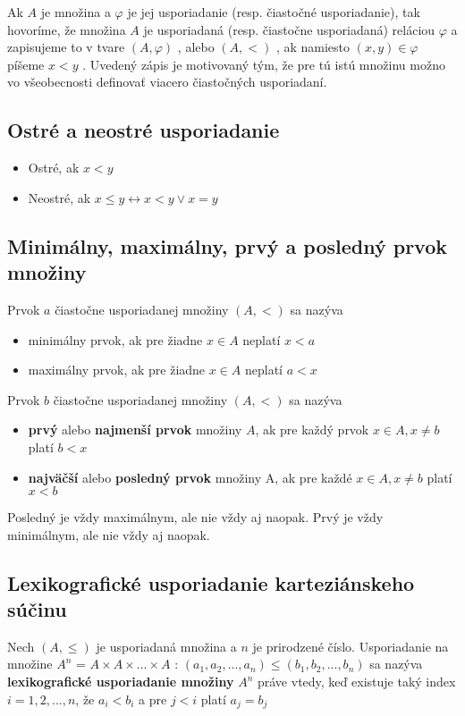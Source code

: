 		Ak $A$ je množina a $\varphi$ je jej usporiadanie (resp. čiastočné usporiadanie), tak hovoríme, že množina $A$ je usporiadaná (resp. čiastočne usporiadaná) reláciou $\varphi$ a zapisujeme to v tvare $( A, \varphi )$ , alebo $( A, < )$ , ak namiesto $( x, y) \in \varphi $ píšeme $x < y$ . Uvedený zápis je motivovaný tým, že pre tú istú množinu možno vo všeobecnosti definovať viacero čiastočných usporiadaní.

	\subsection{Ostré a neostré usporiadanie}
		\begin{itemize}
			\item Ostré, ak $x<y$
			\item Neostré, ak $x \leq y \leftrightarrow x < y \vee x = y$
		\end{itemize}
	\subsection{Minimálny, maximálny, prvý a posledný prvok množiny}
		Prvok $a$ čiastočne usporiadanej množiny $( A, < )$ sa nazýva
		\begin{itemize}
			\item minimálny prvok, ak pre žiadne $x \in A$ neplatí $x < a$
			\item maximálny prvok, ak pre žiadne $x \in A$ neplatí $a < x$
		\end{itemize}
		Prvok $b$ čiastočne usporiadanej množiny $( A, <)$ sa nazýva
		\begin{itemize} 
		\item \textbf{prvý} alebo \textbf{najmenší prvok} množiny $A$, ak pre každý prvok $x \in A, x \neq b$ platí $b < x$
		\item  \textbf{najväčší} alebo \textbf{posledný prvok} množiny A, ak pre každé $x \in A, x \neq b$ platí $x < b$
		\end{itemize}
		
		Posledný je vždy maximálnym, ale nie vždy aj naopak.
		Prvý je vždy minimálnym, ale nie vždy aj naopak.

	\subsection{Lexikografické usporiadanie karteziánskeho súčinu}
		Nech $(A, \leq )$ je usporiadaná množina a $n$ je prirodzené číslo.
		Usporiadanie na množine $A^{n}$ = $A \times A \times ... \times A$ : $(a_{1}, a_{2}, ..., a_{n}) \leq  (b_{1}, b_{2}, ..., b_{n})$ sa nazýva \textbf{lexikografické usporiadanie množiny} $A^n$ práve vtedy, keď existuje taký index $i = 1, 2, ..., n$, že $a_{i} < b_{i}$ a pre $j < i$ platí $a_{j} = b_{j}$\\
